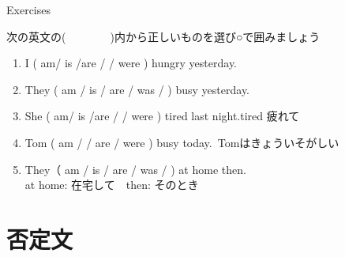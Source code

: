\documentclass[aspectratio=169,xcolor={dvipsnames,table}]{beamer}
\newcommand{\myaudio}[1]{\href{#1}{\faVolumeUp}}
\begin{document}
\begin{frame}[plain]{Exercises}
 
次の英文の(~~~~~~~~)内から正しいものを選び○で囲みましょう

\begin{enumerate}
 \item I ( am/ is /are /  / were ) hungry yesterday.
 \item They ( am / is / are / was /  ) busy yesterday.
 \item She  ( am/ is /are /  / were ) tired last night.\hfill{}{\scriptsize tired  疲れて}
 \item Tom ( am /  / are / were ) busy today.\,\,\,{\scriptsize Tomはきょういそがしい}
 \item They（ am / is / are / was /  ) at home then.\\
       \mbox{}\hfill{}{\scriptsize at home: 在宅して　then: そのとき}
\end{enumerate}

\hfill{\scriptsize \myaudio{./audio/024_past_be_03.mp3}}

\end{frame}


\section{否定文}
\end{document}
